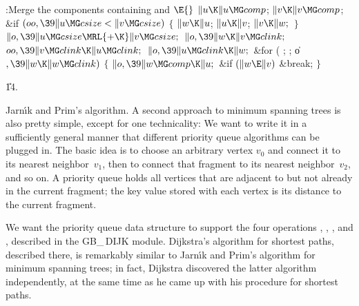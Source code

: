 \Y\B\4:Merge the components containing  and \X${}\E{}$\6
$\|u\K\|u\MG\\{comp}{}$;\6
${}\|v\K\|v\MG\\{comp}{}$;\6
\&{if} ${}(\\{oo},\39\|u\MG\\{csize}<\|v\MG\\{csize}){}$\5
${}\{{}$\1\6
${}\|w\K\|u{}$;\5
${}\|u\K\|v{}$;\5
${}\|v\K\|w;{}$\6
\4${}\}{}$\2\6
${}\|o,\39\|u\MG\\{csize}\MRL{+{\K}}\|v\MG\\{csize};{}$\6
${}\|o,\39\|w\K\|v\MG\\{clink};{}$\6
${}\\{oo},\39\|v\MG\\{clink}\K\|u\MG\\{clink};{}$\6
${}\|o,\39\|u\MG\\{clink}\K\|w;{}$\6
\&{for} ( ;  ; \|o${},\39\|w\K\|w\MG\\{clink}){}$\5
${}\{{}$\1\6
${}\|o,\39\|w\MG\\{comp}\K\|u;{}$\6
\&{if} ${}(\|w\E\|v){}$\1\5
\&{break};\2\6
\4${}\}{}$\2\par
\U14.\fi

Jarn{\'\i}k and Prim's algorithm.
A second approach to minimum spanning trees is also pretty simple,
except for one technicality: We want to write it in a sufficiently
general manner that different priority queue algorithms can be plugged in.
The basic idea is to choose an arbitrary vertex $v_0$ and connect it to its
nearest neighbor~$v_1$, then to connect that fragment to its nearest
neighbor~$v_2$, and so on. A priority queue holds all vertices that
are adjacent to but not already in the current fragment; the key value
stored with each vertex is its distance to the current fragment.

We want the priority queue data structure to support the four
operations , , , and
, described in the {\sc GB\_\,DIJK} module. Dijkstra's
algorithm for shortest paths, described there, is remarkably similar
to Jarn{\'\i}k and Prim's algorithm for minimum spanning trees; in
fact, Dijkstra discovered the latter algorithm independently, at the
same time as he came up with his procedure for shortest paths.


